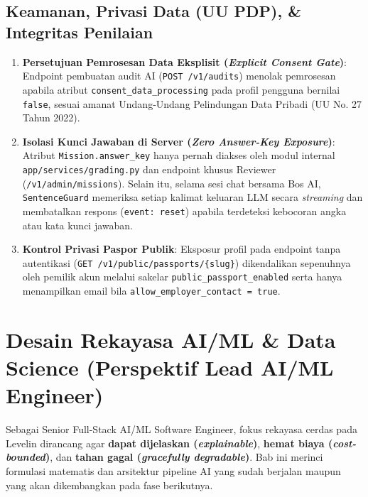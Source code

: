 \documentclass[11pt,a4paper]{report}
\begin{document}
\section{Keamanan, Privasi Data (UU PDP), \& Integritas Penilaian}
\begin{enumerate}[leftmargin=1.5em]
    \item \textbf{Persetujuan Pemrosesan Data Eksplisit (\textit{Explicit Consent Gate})}: Endpoint pembuatan audit AI (\texttt{POST /v1/audits}) menolak pemrosesan apabila atribut \texttt{consent\_data\_processing} pada profil pengguna bernilai \texttt{false}, sesuai amanat Undang-Undang Pelindungan Data Pribadi (UU No. 27 Tahun 2022).
    \item \textbf{Isolasi Kunci Jawaban di Server (\textit{Zero Answer-Key Exposure})}: Atribut \texttt{Mission.answer\_key} hanya pernah diakses oleh modul internal \texttt{app/services/grading.py} dan endpoint khusus Reviewer (\texttt{/v1/admin/missions}). Selain itu, selama sesi chat bersama Bos AI, \texttt{SentenceGuard} memeriksa setiap kalimat keluaran LLM secara \textit{streaming} dan membatalkan respons (\texttt{event: reset}) apabila terdeteksi kebocoran angka atau kata kunci jawaban.
    \item \textbf{Kontrol Privasi Paspor Publik}: Eksposur profil pada endpoint tanpa autentikasi (\texttt{GET /v1/public/passports/\{slug\}}) dikendalikan sepenuhnya oleh pemilik akun melalui sakelar \texttt{public\_passport\_enabled} serta hanya menampilkan email bila \texttt{allow\_employer\_contact = true}.
\end{enumerate}

\chapter{Desain Rekayasa AI/ML \& Data Science (Perspektif Lead AI/ML Engineer)}

Sebagai Senior Full-Stack AI/ML Software Engineer, fokus rekayasa cerdas pada Levelin dirancang agar \textbf{dapat dijelaskan (\textit{explainable})}, \textbf{hemat biaya (\textit{cost-bounded})}, dan \textbf{tahan gagal (\textit{gracefully degradable})}. Bab ini merinci formulasi matematis dan arsitektur pipeline AI yang sudah berjalan maupun yang akan dikembangkan pada fase berikutnya.
\end{document}
